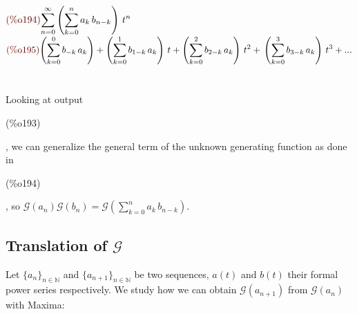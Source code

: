 \begin{math}\displaystyle
\parbox{8ex}{\color{labelcolor}(\%o194) }
\sum_{n=0}^{\infty }\left( \sum_{k=0}^{n}{a}_{k}\,{b}_{n-k}\right) \,{t}^{n}
\end{math}\\
\begin{math}\displaystyle
\parbox{8ex}{\color{labelcolor}(\%o195) }
\left( \sum_{k=0}^{0}{b}_{-k}\,{a}_{k}\right) +\left(
  \sum_{k=0}^{1}{b}_{1-k}\,{a}_{k}\right) \,t+\left(
  \sum_{k=0}^{2}{b}_{2-k}\,{a}_{k}\right) \,{t}^{2}+\\
\left( \sum_{k=0}^{3}{b}_{3-k}\,{a}_{k}\right) \,{t}^{3}+...
\end{math}\\
\\\\
Looking at output \parbox{8ex}{\color{labelcolor}(\%o193) }, we can
generalize the general term of the unknown generating function as done
in \parbox{8ex}{\color{labelcolor}(\%o194) }, so
$\mathcal{G}(a_n)\mathcal{G}(b_n) =\mathcal{G}\left(
  \sum_{k=0}^{n}{a}_{k}\,{b}_{n-k}\right)$.

\subsection{Translation of $\mathcal{G} $}

Let $\{a_n\}_{n\in\mathbb{N} }$ and $\{a_{n+1}\}_{n\in\mathbb{N} } $
be two sequences, $a(t)$ and $b(t)$ their formal power series
respectively. We study how we can obtain $\mathcal{G}(a_{n+1}) $ from
$\mathcal{G} (a_n)$ with Maxima:\\

